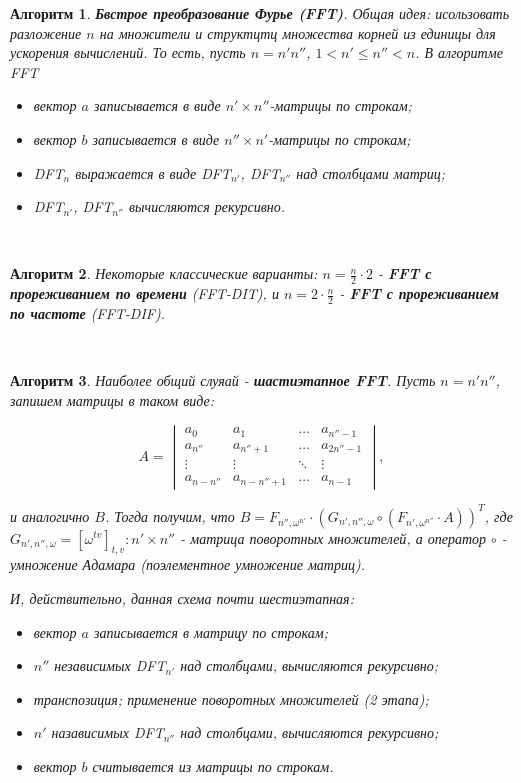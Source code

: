 \documentclass[a4paper]{article}
\theoremstyle{indented}
\newtheorem{alg}{Алгоритм}
\theoremstyle{definition}
\theoremstyle{remark}
\begin{document}
\begin{alg}
    \textbf{Бвстрое преобразование Фурье (FFT)}. Общая идея: исользовать разложение $n$ на множители и структцтц множества корней из единицы для ускорения вычислений. То есть, пусть $n=n'n''$, $1<n'\leq n'' < n$. В алгоритме FFT 

    \begin{itemize}
        \item вектор $a$ записывается в виде $n'\times n''$-матрицы по строкам; 
        \item вектор $b$ записывается в виде $n''\times n'$-матрицы по строкам; 
        \item DFT$_n$ выражается в виде DFT$_{n'}$, DFT$_{n''}$ над столбцами матриц; 
        \item DFT$_{n'}$, DFT$_{n''}$ вычисляются рекурсивно. 
    \end{itemize}
\end{alg} \

\begin{alg}
    Некоторые классические варианты: $n=\frac{n}{2}\cdot 2$ - \textbf{FFT с прореживанием по времени} (FFT-DIT), и $n=2\cdot \frac{n}{2}$ - \textbf{FFT с прореживанием по частоте} (FFT-DIF). 
\end{alg} \ 

\begin{alg}
    Наиболее общий слуяай - \textbf{шастиэтапное FFT}. Пусть $n=n'n''$, запишем матрицы в таком виде:

    \begin{equation*}
        A=
        \begin{vmatrix}
            a_0 & a_1 & \dots & a_{n''-1} \\
            a_{n''} & a_{n''+1} & \dots & a_{2n''-1} \\
            \vdots & \vdots & \ddots & \vdots \\
            a_{n-n''} & a_{n-n''+1} & \dots & a_{n-1} 
        \end{vmatrix}, 
    \end{equation*}

    и аналогично $B$. Тогда получим, что $B=F_{n'', \omega^{n'}}\cdot (G_{n', n'', \omega}\circ (F_{n', \omega^{n''}}\cdot A))^T$, где $G_{n', n'', \omega}=[\omega^{tv}]_{t, v}: n'\times n''$ - матрица \textit{поворотных множителей}, а оператор $\circ$ - \textit{умножение Адамара} (поэлементное умножение матриц). \ 

    И, действительно, данная схема почти шестиэтапная:

    \begin{itemize}
        \item вектор $a$ записывается в матрицу по строкам; 
        \item $n''$ независимых DFT$_{n'}$ над столбцами, вычисляются рекурсивно; 
        \item транспозиция; применение поворотных множителей (2 этапа); 
        \item $n'$ назависимых DFT$_{n''}$ над столбцами, вычисляются рекурсивно; 
        \item вектор $b$ считывается из матрицы по строкам.
    \end{itemize}
\end{alg}
\end{document}
